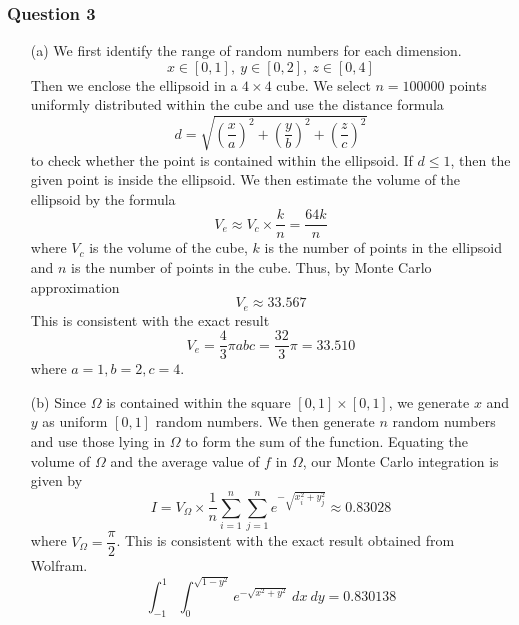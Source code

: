 \documentclass[11pt,a4paper]{article}
\begin{document}
\subsubsection*{Question 3}
\begin{enumerate}
	\item[(a)] We first identify the range of random numbers for each dimension.
	$$x \in [0,1], \ y \in [0,2], \ z \in [0,4]$$
	Then we enclose the ellipsoid in a $4 \times 4$ cube. We select $n=100000$ points uniformly distributed within the cube and use the distance formula 
	$$d=\sqrt{\left(\frac{x}{a}\right)^2+\left(\frac{y}{b}\right)^2+\left(\frac{z}{c}\right)^2}$$ 
	to check whether the point is contained within the ellipsoid. If $d \le 1$, then the given point is inside the ellipsoid. We then estimate the volume of the ellipsoid by the formula
	$$V_e \approx V_c \times \frac{k}{n}=\frac{64k}{n}$$
	where $V_c$ is the volume of the cube, $k$ is the number of points in the ellipsoid and $n$ is the number of points in the cube. Thus, by Monte Carlo approximation 
	$$V_e \approx 33.567$$
	This is consistent with the exact result
	$$V_e=\frac{4}{3}\pi abc = \frac{32}{3}\pi = 33.510$$
	where $a=1, b=2, c=4$.
	
	\item[(b)] Since $\Omega$ is contained within the square $[0,1] \times [0,1]$, we generate $x$ and $y$ as uniform $[0,1]$ random numbers. We then generate $n$ random numbers and use those lying in $\Omega$ to form the sum of the function. Equating the volume of $\Omega$ and the average value of $f$ in $\Omega$, our Monte Carlo integration is given by
	$$I=V_{\Omega} \times \frac{1}{n} \sum^n_{i=1} \sum^n_{j=1} e^{-\sqrt{x^2_i+y^2_j}} \approx 0.83028$$
	where $V_{\Omega}=\dfrac{\pi}{2}$. This is consistent with the exact result obtained from Wolfram.
	$$\int^1_{-1} \int^{\sqrt{1-y^2}}_0 e^{-\sqrt{x^2+y^2}} \ dx \ dy = 0.830138$$
	
\end{enumerate}

\pagebreak
\end{document}
